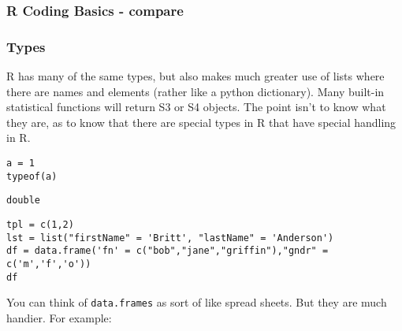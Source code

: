 \documentclass{article}
\begin{document}
\subsubsection{R Coding Basics - compare}
\label{sec:orgb13e9b0}
\subsubsection{Types}
\label{sec:orgbc64423}
R has many of the same types, but also makes much greater use of lists where there are names and elements (rather like a python dictionary). Many built-in statistical functions will return S3 or S4 objects. The point isn't to know what they are, as to know that there are special types in R that have special handling in R.

\begin{verbatim}
a = 1
typeof(a)
\end{verbatim}

\begin{verbatim}
double
\end{verbatim}


\begin{verbatim}
tpl = c(1,2)
lst = list("firstName" = 'Britt', "lastName" = 'Anderson')
df = data.frame('fn' = c("bob","jane","griffin"),"gndr" = c('m','f','o'))
df
\end{verbatim}


You can think of \texttt{data.frames} as sort of like spread sheets. But they are much handier. For example:
\end{document}

